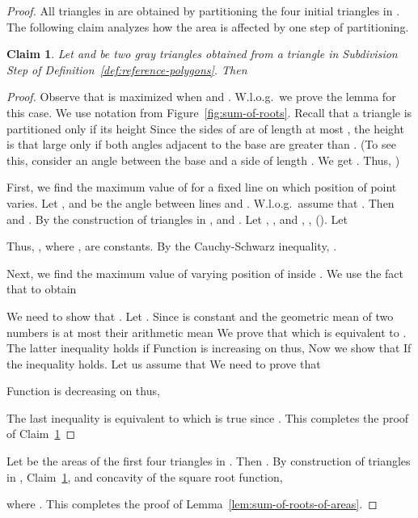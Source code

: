 \documentclass[11pt,english]{article}
\newtheorem{claim}[theorem]{Claim}
\numberwithin{figure}{section}
\newcommand{\mch}[1]{{\color{black}#1}}
\begin{document}
\begin{proof}
All triangles in  are obtained by partitioning the four initial triangles in . The following claim analyzes how the area is affected by one step of partitioning.
\begin{claim}\label{claim:sum-of-roots-of-areas}
Let  and  be two gray triangles obtained from a triangle  in Subdivision Step of Definition~\ref{def:reference-polygons}. Then

\end{claim}

\begin{proof}
Observe that  is maximized when  and . W.l.o.g.\ we prove the lemma for this case. We use notation from Figure~\ref{fig:sum-of-roots}. Recall that a triangle  is partitioned only if its height  Since the sides of  are of length at most , the height is that large only if both angles adjacent to the base  are greater than . (To see this, consider an angle  between the base and a side of length . We get
.
Thus, )

First, we find the maximum value of  for a fixed line  on which position of point  varies. \mch{Let ,  and  be the angle between lines  and . W.l.o.g.\ assume that . Then  and . By the construction of triangles in ,  and . Let , ,  and , ,  ().}  Let\mch{

Thus, , where ,  are constants. By the  Cauchy-Schwarz inequality, .

Next, we find the maximum value of  varying position of  inside . We use the fact that
  to obtain

We need to show that . Let . Since  is constant and the geometric mean of two numbers is at most their arithmetic mean  We prove that  which is equivalent to . The latter inequality holds if  Function  is increasing on  thus,  Now we show that  If  the inequality holds. Let us assume that 
We need to prove that

Function  is decreasing on  thus,

The last inequality is equivalent to  which is true since . This completes the proof of Claim~\ref{claim:sum-of-roots-of-areas}}\end{proof}

Let  be the areas of the first four triangles in . Then .
By construction of triangles in , Claim~\ref{claim:sum-of-roots-of-areas}, and concavity of the square root function,

where .
This completes the proof of Lemma~\ref{lem:sum-of-roots-of-areas}.
\end{proof}
\end{document}
